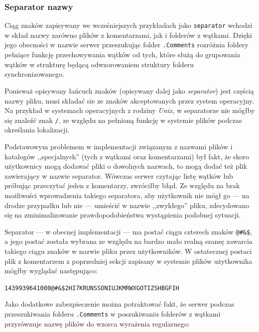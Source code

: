 \documentclass[polish,a4paper,twoside]{ppfcmthesis}
\begin{document}
\subsubsection*{Separator nazwy}

\label{filenames}

Ciąg znaków zapisywany we wcześniejszych przykładach jako \texttt{separator} wchodzi w skład nazwy zarówno plików z komentarzami, jak i folderów z wątkami. Dzięki jego obecności w nazwie serwer przeszukując folder \texttt{.Comments} rozróżnia foldery pełniące funkcję przechowywania wątków od tych, które służą do grupowania wątków w strukturę będącą odwzorowaniem struktury folderu synchronizowanego.

Ponieważ opisywany łańcuch znaków (opisywany dalej jako \emph{separator}) jest częścią nazwy pliku, musi składać sie ze znaków akceptowanych przez system operacyjny. Na przykład w systemach operacyjnych z rodziny \emph{Unix}, w separatorze nie mógłby się znaleźć znak \texttt{/}, ze względu na pełnioną funkcję w systemie plików podczas określania lokalizacji.

Podstawowym problemem w implementacji związanym z nazwami plików i katalogów ,,specjalnych'' (tych z wątkami oraz komentarzami) był fakt, że skoro użytkownicy mogą dodawać pliki o dowolnych nazwach, to mogą dodać też plik zawierający w nazwie separator. Wówczas serwer czytając listę wątków lub próbując przeczytać jeden z komentarzy, zwróciłby błąd. Ze względu na brak możliwości wprowadzenia takiego separatora, aby użytkownik nie mógł go --- na drodze przypadku lub nie --- umieścić w nazwie ,,zwykłego'' pliku, zdecydowano się na zminimalizowanie prawdopodobieństwa wystąpienia podobnej sytuacji.

Separator --- w obecnej implementacji --- ma postać ciągu czterech znaków \texttt{@\#\&\$}, a jego postać została wybrana ze względu na bardzo mało realną szansę zawarcia takiego ciągu znaków w nazwie pliku przez użytkowników. W ostatecznej postaci plik z komentarzem z poprzedniej sekcji zapisany w systemie plików użytkownika mógłby wyglądać następująco:

\begin{center}
  \texttt{1439939641000@\#\&\$2HI7KRUNSSONIUJKMRWXGOTIZSHBGFIH}
\end{center}

Jako dodatkowe zabezpieczenie można potraktować fakt, że serwer podczas przeszukiwania folderu \texttt{.Comments} w poszukiwaniu folderów z wątkami przyrównuje nazwę plików do wzorca wyrażenia regularnego:
\end{document}
